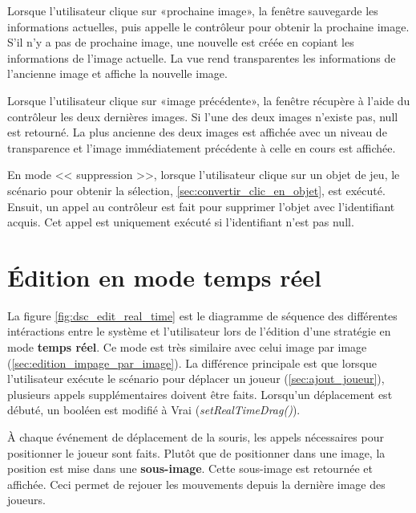 Lorsque l'utilisateur clique sur «prochaine image», la fenêtre sauvegarde les informations actuelles, puis appelle le contrôleur pour obtenir la prochaine image.
S'il n'y a pas de prochaine image, une nouvelle est créée en copiant les informations de l'image actuelle.
La vue rend transparentes les informations de l'ancienne image et affiche la nouvelle image.

Lorsque l'utilisateur clique sur «image précédente», la fenêtre récupère à l'aide du contrôleur les deux dernières images.
Si l'une des deux images n'existe pas, null est retourné.
La plus ancienne des deux images est affichée avec un niveau de transparence et l'image immédiatement précédente à celle en cours est affichée.

En mode << suppression >>, lorsque l'utilisateur clique sur un objet de jeu, le scénario pour obtenir la sélection, \ref{sec:convertir_clic_en_objet}, est exécuté.
Ensuit, un appel au contrôleur est fait pour supprimer l'objet avec l'identifiant acquis.
Cet appel est uniquement exécuté si l'identifiant n'est pas null.

\section{Édition en mode temps réel}
\label{sec:edition_temps_reel}


La figure \ref{fig:dsc_edit_real_time} est le diagramme de séquence des différentes intéractions entre le système et l'utilisateur lors de l'édition d'une stratégie en mode \textbf{temps réel}.
Ce mode est très similaire avec celui image par image (\ref{sec:edition_impage_par_image}).
La différence principale est que lorsque l'utilisateur exécute le scénario pour déplacer un joueur (\ref{sec:ajout_joueur}), plusieurs appels supplémentaires doivent être faits.
Lorsqu'un déplacement est débuté, un booléen est modifié à Vrai (\textit{setRealTimeDrag()}).

À chaque événement de déplacement de la souris, les appels nécessaires pour positionner le joueur sont faits.
Plutôt que de positionner dans une image, la position est mise dans une \textbf{sous-image}.
Cette sous-image est retournée et affichée.
Ceci permet de rejouer les mouvements depuis la dernière image des joueurs.

